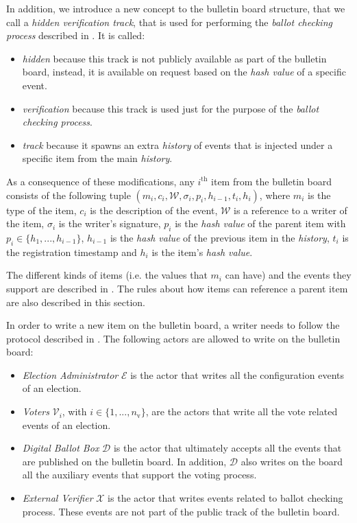 In addition, we introduce a new concept to the bulletin board structure, that we call a \emph{hidden verification track}, that is used for performing the \textit{ballot checking process} described in . It is called:
\begin{itemize}
    \item \emph{hidden} because this track is not publicly available as part of the bulletin board, instead, it is available on request based on the \textit{hash value} of a specific event.
    \item \textit{verification} because this track is used just for the purpose of the \textit{ballot checking process}.
    \item \emph{track} because it spawns an extra \textit{history} of events that is injected under a specific item from the main \textit{history}.
\end{itemize}

As a consequence of these modifications, any $i^\mathrm{th}$ item from the bulletin board consists of the following tuple $(m_i, c_i, \mathcal{W}, \sigma_i, p_i, h_{i-1}, t_i, h_i)$, where $m_i$ is the type of the item, $c_i$ is the description of the event, $\mathcal{W}$ is a reference to a writer of the item, $\sigma_i$ is the writer's signature, $p_i$ is the \textit{hash value} of the parent item with $p_i \in \{h_1, ..., h_{i-1}\}$, $h_{i-1}$ is the \textit{hash value} of the previous item in the \textit{history}, $t_i$ is the registration timestamp and $h_i$ is the item's \textit{hash value}.

The different kinds of items (i.e. the values that $m_i$ can have) and the events they support are described in . The rules about how items can reference a parent item are also described in this section.

In order to write a new item on the bulletin board, a writer needs to follow the protocol described in . The following actors are allowed to write on the bulletin board:
\begin{itemize}
    \item \textit{Election Administrator} $\mathcal{E}$ is the actor that writes all the configuration events of an election.
    \item \textit{Voters} $\mathcal{V}_i$, with $i \in \{1, ..., n_\mathrm{v}\}$, are the actors that write all the vote related events of an election.
    \item \textit{Digital Ballot Box} $\mathcal{D}$ is the actor that ultimately accepts all the events that are published on the bulletin board. In addition, $\mathcal{D}$ also writes on the board all the auxiliary events that support the voting process.
    \item \textit{External Verifier} $\mathcal{X}$ is the actor that writes events related to ballot checking process. These events are not part of the public track of the bulletin board.
\end{itemize}


